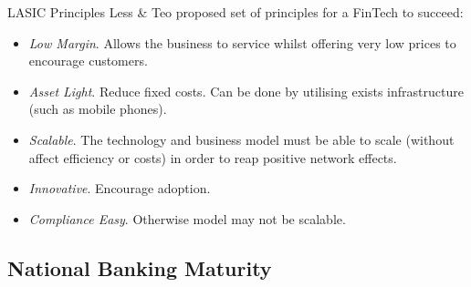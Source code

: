 \documentclass[11pt,a4paper]{article}
\begin{document}
  \begin{proposition}{LASIC Principles}
    Less \& Teo proposed set of principles for a FinTech to succeed:
    \begin{itemize}
      \item \textit{Low Margin}. Allows the business to service whilst offering very low prices to encourage customers.
      \item \textit{Asset Light}. Reduce fixed costs. Can be done by utilising exists infrastructure (such as mobile phones).
      \item \textit{Scalable}. The technology and business model must be able to scale (without affect efficiency or costs) in order to reap positive network effects.
      \item \textit{Innovative}. Encourage adoption.
      \item \textit{Compliance Easy}. Otherwise model may not be scalable.
    \end{itemize}
  \end{proposition}

\subsection{National Banking Maturity}
\end{document}
